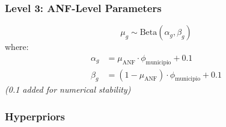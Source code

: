 \documentclass[
]{article}
\begin{document}
\hypertarget{level-3-anf-level-parameters}{%
\subsubsection{Level 3: ANF-Level
Parameters}\label{level-3-anf-level-parameters}}

\[
\mu_g \sim \text{Beta}(\alpha_g, \beta_g)
\] where: \[
\begin{aligned}
\alpha_g &= \mu_{\text{ANF}} \cdot \phi_{\text{municipio}} + 0.1 \\
\beta_g &= (1 - \mu_{\text{ANF}}) \cdot \phi_{\text{municipio}} + 0.1
\end{aligned}
\] \emph{(0.1 added for numerical stability)}

\hypertarget{hyperpriors}{%
\subsubsection{Hyperpriors}\label{hyperpriors}}
\end{document}
